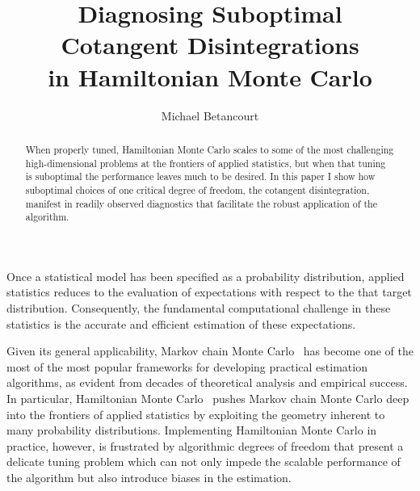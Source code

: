 \documentclass[stslayout]{imsart}
\begin{document}
\begin{frontmatter}

\title{Diagnosing Suboptimal \\
        Cotangent Disintegrations \\
        in Hamiltonian Monte Carlo}

\begin{aug}
  \author{Michael Betancourt%
  }


  \address{Department of Statistics, University of Warwick, 
  Coventry CV4 7AL, UK \\ .}

\end{aug}

\begin{abstract}
When properly tuned, Hamiltonian Monte Carlo scales
to some of the most challenging high-dimensional problems
at the frontiers of applied statistics, but when that tuning is
suboptimal the performance leaves much to be desired.
In this paper I show how suboptimal choices of one critical
degree of freedom, the cotangent disintegration, manifest 
in readily observed diagnostics that facilitate the robust
application of the algorithm.
\end{abstract}

\begin{keyword}
\end{keyword}
\end{frontmatter}

Once a statistical model has been specified as a probability distribution, 
applied statistics reduces to the evaluation of expectations with respect to the 
that target distribution.  Consequently, the fundamental computational challenge 
in these statistics is the accurate and efficient estimation of these expectations.  

Given its general applicability, Markov chain Monte Carlo~\citep{RobertEtAl:1999,
BrooksEtAl:2011} has become one of the most of the most popular frameworks 
for developing practical estimation algorithms, as evident from decades of 
theoretical analysis and empirical success.  In particular, Hamiltonian Monte 
Carlo~\citep{DuaneEtAl:1987, Neal:2011, BetancourtEtAl:2014a} pushes Markov 
chain Monte Carlo deep into the frontiers of applied statistics by exploiting the
geometry inherent to many probability distributions.  Implementing Hamiltonian 
Monte Carlo in practice, however, is frustrated by algorithmic degrees of freedom
that present a delicate tuning problem which can not only impede the scalable
performance of the algorithm but also introduce biases in the estimation.  
\end{document}
